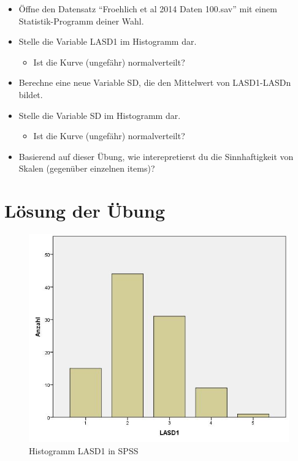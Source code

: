 \documentclass[
]{book}
\providecommand{\tightlist}{%
  \setlength{\itemsep}{0pt}\setlength{\parskip}{0pt}}
\begin{document}
\begin{itemize}
\tightlist
\item
  Öffne den Datensatz ``Froehlich et al 2014 Daten 100.sav'' mit einem Statistik-Programm deiner Wahl.
\item
  Stelle die Variable LASD1 im Histogramm dar.

  \begin{itemize}
  \tightlist
  \item
    Ist die Kurve (ungefähr) normalverteilt?
  \end{itemize}
\item
  Berechne eine neue Variable SD, die den Mittelwert von LASD1-LASDn bildet.
\item
  Stelle die Variable SD im Histogramm dar.

  \begin{itemize}
  \tightlist
  \item
    Ist die Kurve (ungefähr) normalverteilt?
  \end{itemize}
\item
  Basierend auf dieser Übung, wie interepretierst du die Sinnhaftigkeit von Skalen (gegenüber einzelnen items)?
\end{itemize}

\hypertarget{luxf6sung-der-uxfcbung}{%
\section{Lösung der Übung}\label{luxf6sung-der-uxfcbung}}

\begin{figure}
\centering
\includegraphics{pics/SPSS_LASD1_hist.jpg}
\caption{Histogramm LASD1 in SPSS}
\end{figure}
\end{document}
